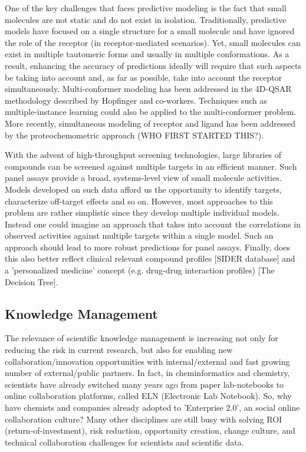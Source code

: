 \documentclass{sig-alternate}
\begin{document}
One of the key challenges that faces predictive modeling is the fact that small
molecules are not static and do not exist in isolation. Traditionally,
predictive models have focused on a single structure for a small molecule and
have ignored the role of the receptor (in receptor-mediated scenarios). Yet,
small molecules can exist in multiple tautomeric forms and usually in multiple
conformations. As a result, enhancing the accuracy of predictions ideally will
require that such aspects be taking into account and, as far as possible, take
into account the receptor simultaneously. Multi-conformer modeling has been
addressed in the 4D-QSAR methodology described by Hopfinger and co-workers.
Techniques such as multiple-instance learning could also be applied to the
multi-conformer problem. More recently, simultaneous modeling of receptor and
ligand has been addressed by the proteochemometric approach (WHO FIRST STARTED
THIS?).

With the advent of high-throughput screening technologies, large libraries of
compounds can be screened against multiple targets in an efficient manner. Such
panel assays provide a broad, systems-level view of small molecule activities.
Models developed on such data afford us the opportunity to identify targets,
characterize off-target effects and so on. However, most approaches to this
problem are rather simplistic since they develop multiple individual models.
Instead one could imagine an approach that takes into account the correlations
in observed activities against multiple targets within a single model. Such an
approach should lead to more robust predictions for panel assays. Finally, does
this also better reflect clinical relevant compound profiles [SIDER database]
and a 'personalized medicine' concept (e.g. drug-drug interaction profiles) [The
Decision Tree].

\subsection{Knowledge Management}
\label{sec:knowledge-management}

The relevance of scientific knowledge management is increasing not only for
reducing the risk in current research, but also for enabling new
collaboration/innovation opportunities with internal/external and fast growing
number of external/public partners. In fact, in cheminformatics and chemistry,
scientists have already switched many years ago from paper lab-notebooks to
online collaboration platforms, called ELN (Electronic Lab Notebook). So, why
have chemists and companies already adopted to 'Enterprise 2.0', an social
online collaboration culture? Many other disciplines are still busy with solving
ROI (return-of-investment), risk reduction, opportunity creation, change
culture, and technical collaboration challenges for scientists and scientific
data.
\end{document}
